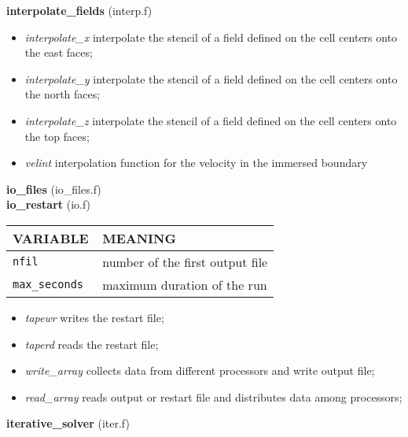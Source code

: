 %
{\large{\bf interpolate\_fields}} (interp.f)\\
\begin{itemize}
\item{\em interpolate\_x} interpolate the stencil of a field defined on the cell centers onto the east faces;
\item{\em interpolate\_y}  interpolate the stencil of a field defined on the cell centers onto the north faces;
\item{\em interpolate\_z}  interpolate the stencil of a field defined on the cell centers onto the top faces;
\item{\em velint}  interpolation function for the velocity in the immersed boundary
\end{itemize}
%
%
{\large{\bf io\_files}} (io\_files.f)\\
%
%
{\large{\bf io\_restart}} (io.f)\\[5mm]
\begin{tabular}{|p{6cm}|p{6cm}|}\hline
VARIABLE & MEANING\\\hline
\tt nfil & number of the first output file \\ \hline
\tt max\_seconds & maximum duration of the run \\ \hline
\end{tabular}
\begin{itemize}
\item{\em tapewr} writes the restart file;
\item{\em taperd} reads the restart file;
\item{\em write\_array} collects data from different processors and write output file;
\item{\em read\_array}  reads output or restart file and distributes data among processors;
\end{itemize}
%
%
{\large{\bf iterative\_solver}} (iter.f)\\[5mm]
